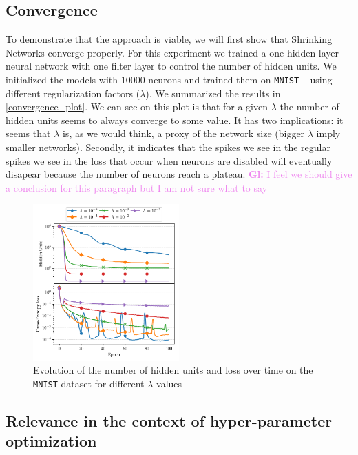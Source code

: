 \documentclass[sigconf]{acmart}
\newcommand{\gl}[1]{\textcolor{violet}{{\bf Gl:} #1}}
\begin{document}
\subsection{Convergence}

To demonstrate that the approach is viable, we will first show that Shrinking
Networks converge properly. For this experiment we trained a one hidden layer
neural network with one filter layer to control the number of hidden units. We
initialized the models with $10000$ neurons and trained them on \texttt{MNIST}
~\cite{Lecun1998} using different regularization factors ($\lambda$). We
summarized the results in \autoref{convergence_plot}. We can see on this plot
is that for a given $\lambda$ the number of hidden units seems to always
converge to some value. It has two implications: it seems that $\lambda$ is, as
we would think, a proxy of the network size (bigger $\lambda$ imply smaller
networks). Secondly, it indicates that the spikes we see in the regular spikes
we see in the loss that occur when neurons are disabled will eventually
disapear because the number of neurons reach a plateau. \gl{I feel we should
  give a conclusion for this paragraph but I am not sure what to say}
\begin{figure}
\begin{center}
\includegraphics[width=0.5\textwidth]{convergence}
\caption{Evolution of the number of hidden units and loss over time on the \texttt{MNIST} dataset for different $\lambda$ values \label{convergence_plot}}
\end{center}
\end{figure}


\subsection{Relevance in the context of hyper-parameter optimization}
\end{document}
